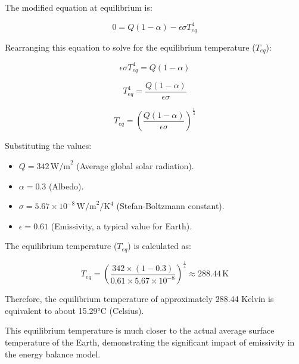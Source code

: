 \documentclass[12pt]{article}
\begin{document}
The modified equation at equilibrium is:

\begin{equation}
0 = Q(1 - \alpha) - \epsilon\sigma T_{eq}^4
\end{equation}

Rearranging this equation to solve for the equilibrium temperature ($T_{eq}$):

\begin{equation}
\epsilon\sigma T_{eq}^4 = Q(1 - \alpha)
\end{equation}

\begin{equation}
T_{eq}^4 = \frac{Q(1 - \alpha)}{\epsilon\sigma}
\end{equation}

\begin{equation}
T_{eq} = \left( \frac{Q(1 - \alpha)}{\epsilon\sigma} \right)^{\frac{1}{4}}
\end{equation}

Substituting the values:
\begin{itemize}
    \item $Q = 342 \, \text{W/m}^2$ (Average global solar radiation).
    \item $\alpha = 0.3$ (Albedo).
    \item $\sigma = 5.67 \times 10^{-8} \, \text{W/m}^2/\text{K}^4$ (Stefan-Boltzmann constant).
    \item $\epsilon = 0.61$ (Emissivity, a typical value for Earth).
\end{itemize}

The equilibrium temperature ($T_{eq}$) is calculated as:

\begin{equation}
T_{eq} = \left( \frac{342 \times (1 - 0.3)}{0.61 \times 5.67 \times 10^{-8}} \right)^{\frac{1}{4}} \approx 288.44 \, \text{K}
\end{equation}

Therefore, the equilibrium temperature of approximately 288.44 Kelvin 
is equivalent to about 15.29°C (Celsius).

This equilibrium temperature is much closer to the actual average surface temperature of the Earth, 
demonstrating the significant impact of emissivity 
in the energy balance model.

\end{document}
